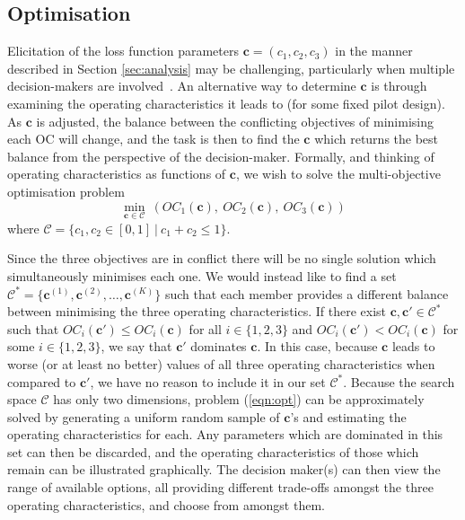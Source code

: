 \documentclass[AMA,STIX1COL]{WileyNJD-v2}
\begin{document}
\subsection{Optimisation}\label{sec:optimisation}

Elicitation of the loss function parameters $\mathbf{c} = (c_1, c_2, c_3)$ in the manner described in Section \ref{sec:analysis} may be challenging, particularly when multiple decision-makers are involved~\cite{Keeney1976}. An alternative way to determine $\mathbf{c}$ is through examining the operating characteristics it leads to (for some fixed pilot design). As $\mathbf{c}$ is adjusted, the balance between the conflicting objectives of minimising each OC will change, and the task is then to find the $\mathbf{c}$ which returns the best balance from the perspective of the decision-maker. Formally, and thinking of operating characteristics as functions of $\mathbf{c}$, we wish to solve the multi-objective optimisation problem
\begin{equation}\label{eqn:opt}
\min_{\mathbf{c} \in \mathcal{C}} ~ \left( OC_{1}(\mathbf{c}),~ OC_{2}(\mathbf{c}),~ OC_{3}(\mathbf{c}) \right)
\end{equation}
where $\mathcal{C} = \{c_{1}, c_{2} \in [0,1] ~|~ c_{1} + c_{2} \leq 1\}$. 

Since the three objectives are in conflict there will be no single solution which simultaneously minimises each one. We would instead like to find a set $\mathcal{C}^* = \{ \mathbf{c}^{(1)}, \mathbf{c}^{(2)}, \ldots, \mathbf{c}^{(K)} \}$ such that each member provides a different balance between minimising the three operating characteristics. If there exist $\mathbf{c}, \mathbf{c}' \in \mathcal{C}^*$ such that $OC_i(\mathbf{c}') \leq OC_i(\mathbf{c})$ for all $i \in \{1, 2, 3\}$ and $OC_i(\mathbf{c}') < OC_i(\mathbf{c})$ for some $i \in \{1, 2, 3\}$, we say that $\mathbf{c}'$ dominates $\mathbf{c}$. In this case, because $\mathbf{c}$ leads to worse (or at least no better) values of all three operating characteristics when compared to $\mathbf{c}'$, we have no reason to include it in our set $\mathcal{C}^*$. Because the search space $\mathcal{C}$ has only two dimensions, problem (\ref{eqn:opt}) can be approximately solved by generating a uniform random sample of $\mathbf{c}$'s and estimating the operating characteristics for each. Any parameters which are dominated in this set can then be discarded, and the operating characteristics of those which remain can be illustrated graphically. The decision maker(s) can then view the range of available options, all providing different trade-offs amongst the three operating characteristics, and choose from amongst them. 
\end{document}
